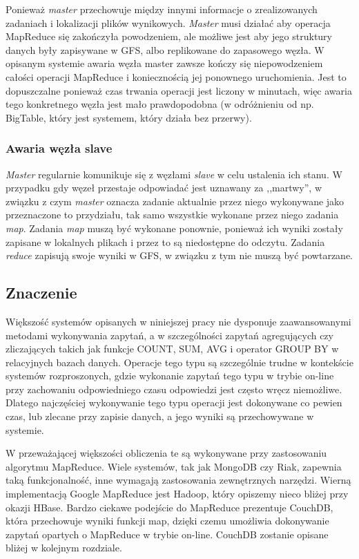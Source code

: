 Ponieważ \emph{master} przechowuje między innymi informacje o zrealizowanych zadaniach i lokalizacji plików wynikowych.
\emph{Master} musi działać aby operacja MapReduce się zakończyła powodzeniem, ale możliwe jest aby jego struktury danych były zapisywane w GFS, albo replikowane do zapasowego węzła.
W opisanym systemie awaria węzła master zawsze kończy się niepowodzeniem całości operacji MapReduce i koniecznością jej ponownego uruchomienia.
Jest to dopuszczalne ponieważ czas trwania operacji jest liczony w minutach, więc awaria tego konkretnego węzła jest mało prawdopodobna (w odróżnieniu od np. BigTable, który jest systemem, który działa bez przerwy).

\subsubsection*{Awaria węzła slave}

\emph{Master} regularnie komunikuje się z węzłami \emph{slave} w celu ustalenia ich stanu.
W przypadku gdy węzeł przestaje odpowiadać jest uznawany za ,,martwy'', w związku z czym \emph{master} oznacza zadanie aktualnie przez niego wykonywane jako przeznaczone to przydziału, tak samo wszystkie wykonane przez niego zadania \emph{map}.
Zadania \emph{map} muszą być wykonane ponownie, ponieważ ich wyniki zostały zapisane w lokalnych plikach i przez to są niedostępne do odczytu.
Zadania \emph{reduce} zapisują swoje wyniki w GFS, w związku z tym nie muszą być powtarzane. 

\subsection*{Znaczenie}

Większość systemów opisanych w niniejszej pracy nie dysponuje zaawansowanymi metodami wykonywania zapytań, a w szczególności zapytań agregujących czy zliczających takich jak funkcje COUNT, SUM, AVG i operator GROUP BY w relacyjnych bazach danych.
Operacje tego typu są szczególnie trudne w kontekście systemów rozproszonych, gdzie wykonanie zapytań tego typu w trybie on-line przy zachowaniu odpowiedniego czasu odpowiedzi jest często wręcz niemożliwe.
Dlatego najczęściej wykonywanie tego typu operacji jest dokonywane co pewien czas, lub zlecane przy zapisie danych, a jego wyniki są przechowywane w systemie.

W przeważającej większości obliczenia te są wykonywane przy zastosowaniu algorytmu MapReduce.
Wiele systemów, tak jak MongoDB czy Riak, zapewnia taką funkcjonalność, inne wymagają zastosowania zewnętrznych narzędzi.
Wierną implementacją Google MapReduce jest Hadoop, który opiszemy nieco bliżej przy okazji HBase.
Bardzo ciekawe podejście do MapReduce prezentuje CouchDB, która przechowuje wyniki funkcji map, dzięki czemu umożliwia dokonywanie zapytań opartych o MapReduce w trybie on-line.
CouchDB zostanie opisane bliżej w kolejnym rozdziale.

